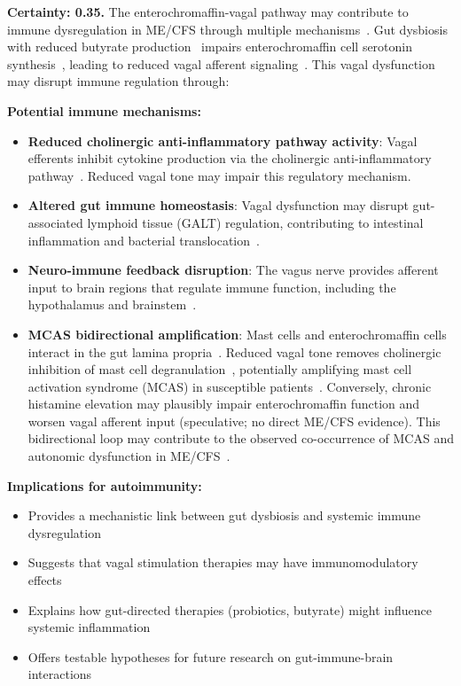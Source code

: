 \begin{speculation}
\label{spec:enterochromaffin-autoimmune}
\textbf{Certainty: 0.35.} The enterochromaffin-vagal pathway may contribute to immune dysregulation in ME/CFS through multiple mechanisms~\cite{WirthScheibenbogen2025Neurotransmitter}. Gut dysbiosis with reduced butyrate production~\cite{Giloteaux2016, Hsu2025gut} impairs enterochromaffin cell serotonin synthesis~\cite{Barton2025}, leading to reduced vagal afferent signaling~\cite{Barton2023, Kaelberer2018}. This vagal dysfunction may disrupt immune regulation through:

\textbf{Potential immune mechanisms:}
\begin{itemize}
    \item \textbf{Reduced cholinergic anti-inflammatory pathway activity}: Vagal efferents inhibit cytokine production via the cholinergic anti-inflammatory pathway~\cite{Barton2023}. Reduced vagal tone may impair this regulatory mechanism.
    \item \textbf{Altered gut immune homeostasis}: Vagal dysfunction may disrupt gut-associated lymphoid tissue (GALT) regulation, contributing to intestinal inflammation and bacterial translocation~\cite{Hsu2025gut}.
    \item \textbf{Neuro-immune feedback disruption}: The vagus nerve provides afferent input to brain regions that regulate immune function, including the hypothalamus and brainstem~\cite{Kaelberer2018}.
    \item \textbf{MCAS bidirectional amplification}: Mast cells and enterochromaffin cells interact in the gut lamina propria~\cite{Barton2025}. Reduced vagal tone removes cholinergic inhibition of mast cell degranulation~\cite{Barton2023}, potentially amplifying mast cell activation syndrome (MCAS) in susceptible patients~\cite{Frioni2025MCAS, Novak2022}. Conversely, chronic histamine elevation may plausibly impair enterochromaffin function and worsen vagal afferent input (speculative; no direct ME/CFS evidence). This bidirectional loop may contribute to the observed co-occurrence of MCAS and autonomic dysfunction in ME/CFS~\cite{Novak2022}.
\end{itemize}

\textbf{Implications for autoimmunity:}
\begin{itemize}
    \item Provides a mechanistic link between gut dysbiosis and systemic immune dysregulation
    \item Suggests that vagal stimulation therapies may have immunomodulatory effects
    \item Explains how gut-directed therapies (probiotics, butyrate) might influence systemic inflammation
    \item Offers testable hypotheses for future research on gut-immune-brain interactions
\end{itemize}


\end{speculation}
